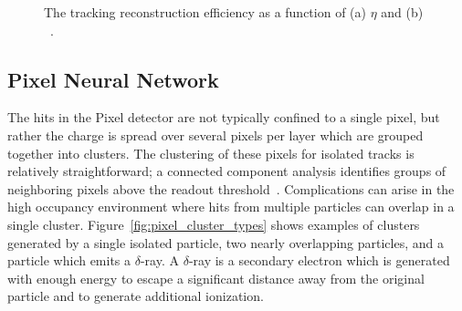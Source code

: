 \begin{figure}
\caption{The tracking reconstruction efficiency as a function of (a) $\eta$ and (b) \pt~\cite{ATL-PHYS-PUB-2015-051}.}
\label{fig:track_reco_eff}
\end{figure}

\subsection{Pixel Neural Network}
\label{sec:pixelnn}

The hits in the Pixel detector are not typically confined to a single pixel, but rather the charge is spread over several pixels per layer which are grouped together into clusters.
The clustering of these pixels for isolated tracks is relatively straightforward; a connected component analysis identifies groups of neighboring pixels above the readout threshold~\cite{pixel_nn}.
Complications can arise in the high occupancy environment where hits from multiple particles can overlap in a single cluster.
Figure~\ref{fig:pixel_cluster_types} shows examples of clusters generated by a single isolated particle, two nearly overlapping particles, and a particle which emits a $\delta$-ray. 
A $\delta$-ray is a secondary electron which is generated with enough energy to escape a significant distance away from the original particle and to generate additional ionization.

